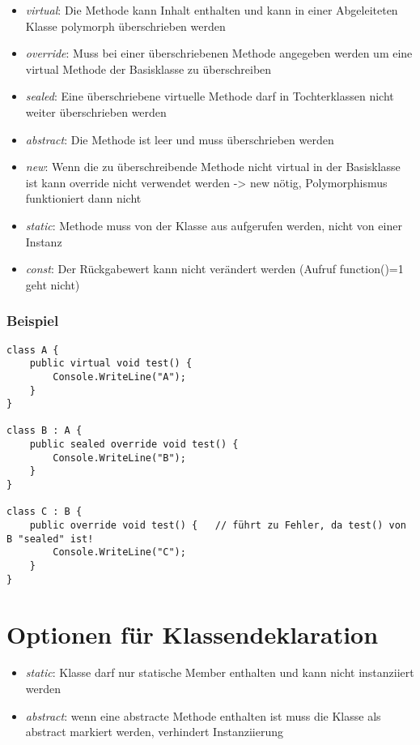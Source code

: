 \begin{itemize}
\item \emph{virtual}: Die Methode kann Inhalt enthalten und kann in einer Abgeleiteten Klasse polymorph überschrieben werden
\item \emph{override}: Muss bei einer überschriebenen Methode angegeben werden um eine virtual Methode der Basisklasse zu überschreiben
\item \emph{sealed}: Eine überschriebene virtuelle Methode darf in Tochterklassen nicht weiter überschrieben werden
\item \emph{abstract}: Die Methode ist leer und muss überschrieben werden
\item \emph{new}: Wenn die zu überschreibende Methode nicht virtual in der Basisklasse ist kann override nicht verwendet werden -{\textgreater} new nötig, Polymorphismus funktioniert dann nicht
\item \emph{static}: Methode muss von der Klasse aus aufgerufen werden, nicht von einer Instanz
\item \emph{const}: Der Rückgabewert kann nicht verändert werden (Aufruf function()=1 geht nicht)
\end{itemize}

\subsubsection*{Beispiel}
\begin{lstlisting}[language={[Sharp]C}]
class A {
	public virtual void test() {
		Console.WriteLine("A");
	}
}

class B : A {
	public sealed override void test() {
		Console.WriteLine("B");
	}
}

class C : B {
	public override void test() {	// führt zu Fehler, da test() von B "sealed" ist!
		Console.WriteLine("C");
	}
}
\end{lstlisting}

\section{Optionen für Klassendeklaration}

\begin{itemize}
\item \emph{static}: Klasse darf nur statische Member enthalten und kann nicht instanziiert werden 
\item \emph{abstract}: wenn eine abstracte Methode enthalten ist muss die Klasse als abstract markiert werden, verhindert Instanziierung
\end{itemize}

